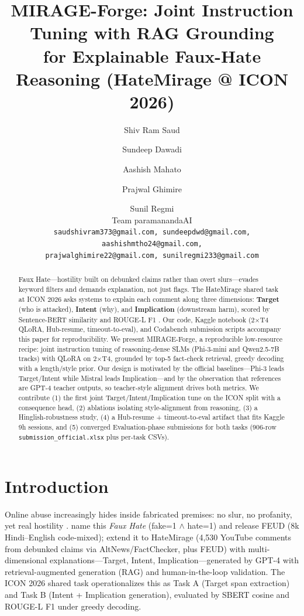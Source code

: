 \documentclass[11pt]{article}
\title{MIRAGE-Forge: Joint Instruction Tuning with RAG Grounding\\for Explainable Faux-Hate Reasoning (HateMirage @ ICON 2026)}
\author{Shiv Ram Saud \and Sundeep Dawadi \and Aashish Mahato \and Prajwal Ghimire \and Sunil Regmi \\
  Team paramanandaAI \\
  \texttt{saudshivram373@gmail.com, sundeepdwd@gmail.com, aashishmtho24@gmail.com,} \\
  \texttt{prajwalghimire22@gmail.com, sunilregmi233@gmail.com}}
\begin{document}
\maketitle
\begin{abstract}
Faux Hate---hostility built on debunked claims rather than overt slurs---evades keyword filters and demands explanation, not just flags.
The HateMirage shared task at ICON 2026 asks systems to explain each comment along three dimensions: \textbf{Target} (who is attacked), \textbf{Intent} (why), and \textbf{Implication} (downstream harm), scored by Sentence-BERT similarity and ROUGE-L F1 \cite{kasu2026hatemirage}.
Our code, Kaggle notebook (2$\times$T4 QLoRA, Hub-resume, timeout-to-eval), and Codabench submission scripts accompany this paper for reproducibility.
We present MIRAGE-Forge, a reproducible low-resource recipe: joint instruction tuning of reasoning-dense SLMs (Phi-3-mini and Qwen2.5-7B tracks) with QLoRA on 2$\times$T4, grounded by top-5 fact-check retrieval, greedy decoding with a length/style prior.
Our design is motivated by the official baselines---Phi-3 leads Target/Intent while Mistral leads Implication---and by the observation that references are GPT-4 teacher outputs, so teacher-style alignment drives both metrics.
We contribute (1) the first joint Target/Intent/Implication tune on the ICON split with a consequence head, (2) ablations isolating style-alignment from reasoning, (3) a Hinglish-robustness study, (4) a Hub-resume + timeout-to-eval artifact that fits Kaggle 9h sessions, and (5) converged Evaluation-phase submissions for both tasks (906-row \texttt{submission\_official.xlsx} plus per-task CSVs).
\end{abstract}

\section{Introduction}
Online abuse increasingly hides inside fabricated premises: no slur, no profanity, yet real hostility \cite{fortuna2018survey,schmidt2017survey}.
\citet{biradar2025fauxhate} name this \emph{Faux Hate} (fake=1 $\land$ hate=1) and release FEUD (8k Hindi--English code-mixed); \citet{kasu2026hatemirage} extend it to HateMirage (4,530 YouTube comments from debunked claims via AltNews/FactChecker, plus FEUD) with multi-dimensional explanations---Target, Intent, Implication---generated by GPT-4 with retrieval-augmented generation (RAG) \cite{lewis2020rag} and human-in-the-loop validation.
The ICON 2026 shared task operationalizes this as Task A (Target span extraction) and Task B (Intent + Implication generation), evaluated by SBERT cosine \cite{reimers2019sbert} and ROUGE-L F1 \cite{lin2004rouge} under greedy decoding.
\end{document}
